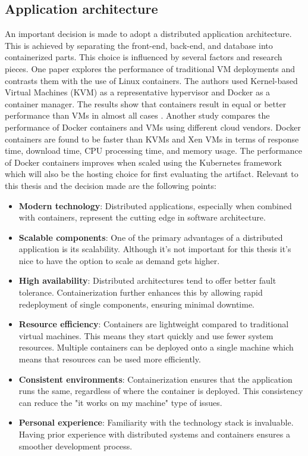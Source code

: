 \subsection{Application architecture}

An important decision is made to adopt a distributed application 
architecture. This is achieved by separating the front-end, back-end, and database into containerized parts. 
This choice is influenced by several factors and research pieces. 
One paper explores the performance of traditional VM deployments and 
contrasts them with the use of Linux containers. 
The authors used Kernel-based Virtual Machines (KVM) as a representative hypervisor and Docker as a container manager. 
The results show that containers result in equal or better 
performance than VMs in almost all cases \parencite{felter2015updated}. 
Another study compares the performance of Docker containers and VMs using 
different cloud vendors. 
Docker containers are found to be faster than KVMs and Xen VMs in terms of response time, 
download time, CPU processing time, and memory usage. 
The performance of Docker containers improves when scaled using the 
Kubernetes framework \parencite{chengeta2021comparing} which will also be 
the hosting choice for first evaluating the artifact. 
Relevant to this thesis and the decision made are the following points:

\begin{itemize}
    \item \textbf{Modern technology}: Distributed applications, especially when combined with containers, represent the cutting edge in software architecture. 
    \item \textbf{Scalable components}: One of the primary advantages of a distributed application is its scalability. Although it's not important for this thesis it's nice to have the option to scale as demand gets higher.
    \item \textbf{High availability}: Distributed architectures tend to offer better fault tolerance. Containerization further enhances this by allowing rapid redeployment of single components, ensuring minimal downtime.
    \item \textbf{Resource efficiency}: Containers are lightweight compared to traditional virtual machines. This means they start quickly and use fewer system resources. Multiple containers can be deployed onto a single machine which means that resources can be used more efficiently.
    \item \textbf{Consistent environments}: Containerization ensures that the application runs the same, regardless of where the container is deployed. This consistency can reduce the "it works on my machine" type of issues. 
    \item \textbf{Personal experience}: Familiarity with the technology stack is invaluable. Having prior experience with distributed systems and containers ensures a smoother development process.
\end{itemize}

